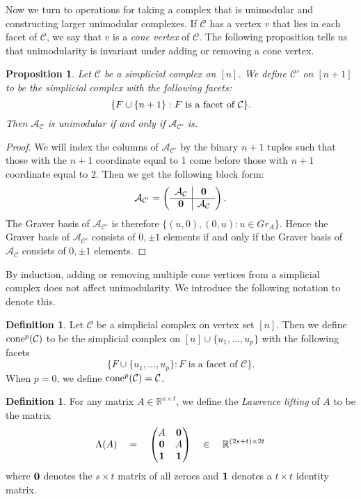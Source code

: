 \documentclass[letterpaper,12pt]{amsart}
\theoremstyle{plain}
\newtheorem{prop}[thm]{Proposition}
\theoremstyle{definition}
\newtheorem{defn}[thm]{Definition}
\theoremstyle{remark}
\newcommand{\rr}{\mathbb{R}}
\newcommand{\calc}{\mathcal{C}}
\newcommand{\cone}{\textnormal{cone}}
\begin{document}
Now we turn to operations for taking a complex that
is unimodular and constructing larger unimodular complexes.
If $\mathcal{C}$ has a vertex $v$ that lies in each facet of $\mathcal{C}$, we say that $v$ is a \emph{cone vertex} of $\mathcal{C}$.
The following proposition tells us that unimodularity is invariant under adding or removing a cone vertex.

\begin{prop}\label{cone}
	Let $\mathcal{C}$ be a simplicial complex on $[n]$.
	We define $\mathcal{C}'$ on $[n+1]$ to be the simplicial complex with the following facets:
	\[
		\{F \cup \{n+1\}: F \textnormal{ is a facet of } \mathcal{C}\}.
	\]
	Then $\mathcal{A}_\mathcal{C}$ is unimodular if and only if $\mathcal{A}_{\mathcal{C}'}$ is.
\end{prop}

\begin{proof}
	We will index the columns of $\mathcal{A}_{\mathcal{C}'}$ by the binary $n+1$ tuples
	such that those with the $n+1$ coordinate equal to 1 come before those with $n+1$ coordinate equal to $2$.
	Then we get the following block form:
	\[
		\mathcal{A}_{\mathcal{C}'} = \left(\begin{array}{c|c}
		\mathcal{A}_\mathcal{C} & {\bf 0} \\ \hline
		{\bf 0} & \mathcal{A}_\mathcal{C}
		\end{array}\right).
	\]
	The Graver basis of $\mathcal{A}_{\mathcal{C}'}$ is therefore $\{(u,0), (0,u) : u \in Gr_A\}$.
	Hence the Graver basis of $\mathcal{A}_{\calc'}$ consists of $0, \pm 1$ elements if and
	only if the Graver basis of $\mathcal{A}_\calc$ consists of $0, \pm 1$ elements.
\end{proof}

By induction, adding or removing multiple cone vertices from a simplicial complex does not affect unimodularity.
We introduce the following notation to denote this.

\begin{defn}\label{cone}
	Let $\mathcal{C}$ be a simplicial complex on vertex set $[n]$. Then we define $\cone^p(\mathcal{C})$
	to be the simplicial complex on $[n] \cup \{u_1,\dots,u_p\}$ with the following facets
	\[
		\{F \cup \{u_1,\dots,u_p\} : F \text{ is a facet of } \mathcal{C} \}.
	\]
	When $p = 0$, we define $\cone^p(\mathcal{C}) = \mathcal{C}$.
\end{defn}


\begin{defn}
	For any matrix $A \in \rr^{s \times t}$, we define the \emph{Lawrence lifting} of $A$ to be the matrix
	\[
		\Lambda(A) \quad =  \quad
			\begin{pmatrix}
				A & {\bf 0}\\
				{\bf 0} & A\\
				{\bf 1} & {\bf 1}
			\end{pmatrix}  \quad \in \quad   \rr^{ (2s + t)  \times 2t}
	\]
	where ${\bf 0}$ denotes the $s \times t$ matrix of all zeroes and 
	${\bf 1}$ denotes a $t \times t$ identity matrix.
\end{defn}
\end{document}
